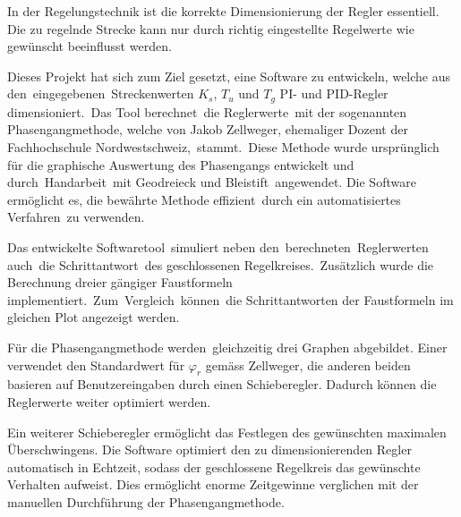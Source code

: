 In  der   Regelungstechnik  ist   die  korrekte  Dimensionierung   der  Regler
essentiell. Die  zu  regelnde  Strecke  kann nur  durch  richtig  eingestellte
Regelwerte wie gew\"unscht beeinflusst werden. 
 

Dieses  Projekt  hat sich  zum  Ziel  gesetzt,  eine Software  zu  entwickeln,
welche  aus   den eingegebenen Streckenwerten  $K_s$,  $T_u$  und   $T_g$  PI-
und  PID-Regler  dimensioniert. Das  Tool  berechnet die  Reglerwerte mit  der
sogenannten   Phasengangmethode,  welche   von  Jakob   Zellweger,  ehemaliger
Dozent   der  Fachhochschule   Nordwestschweiz, stammt. Diese  Methode   wurde
urspr\"unglich  f\"ur die  graphische  Auswertung  des Phasengangs  entwickelt
und  durch Handarbeit mit  Geodreieck und  Bleistift angewendet. Die  Software
erm\"oglicht es,  die bew\"ahrte  Methode effizient durch  ein automatisiertes
Verfahren zu verwenden.
 

Das  entwickelte   Softwaretool simuliert  neben  den berechneten Reglerwerten
auch die    Schrittantwort des     geschlossenen    Regelkreises. Zus\"atzlich
wurde      die       Berechnung      dreier       g\"angiger      Faustformeln
implementiert. Zum Vergleich k\"onnen die Schrittantworten der Faustformeln im
gleichen Plot angezeigt werden.


F\"ur die Phasengangmethode werden gleichzeitig drei Graphen abgebildet. Einer
verwendet den  Standardwert f\"ur $\varphi_r$ gem\"ass  Zellweger, die anderen
beiden  basieren  auf   Benutzereingaben  durch  einen  Schieberegler. Dadurch
k\"onnen die Reglerwerte weiter optimiert werden.


Ein  weiterer  Schieberegler  erm\"oglicht  das  Festlegen  des  gew\"unschten
maximalen  \"Uberschwingens. Die Software  optimiert den  zu dimensionierenden
Regler  automatisch  in  Echtzeit,  sodass  der  geschlossene  Regelkreis  das
gew\"unschte   Verhalten   aufweist. Dies  erm\"oglicht   enorme   Zeitgewinne
verglichen mit der manuellen Durchf\"uhrung der Phasengangmethode.
